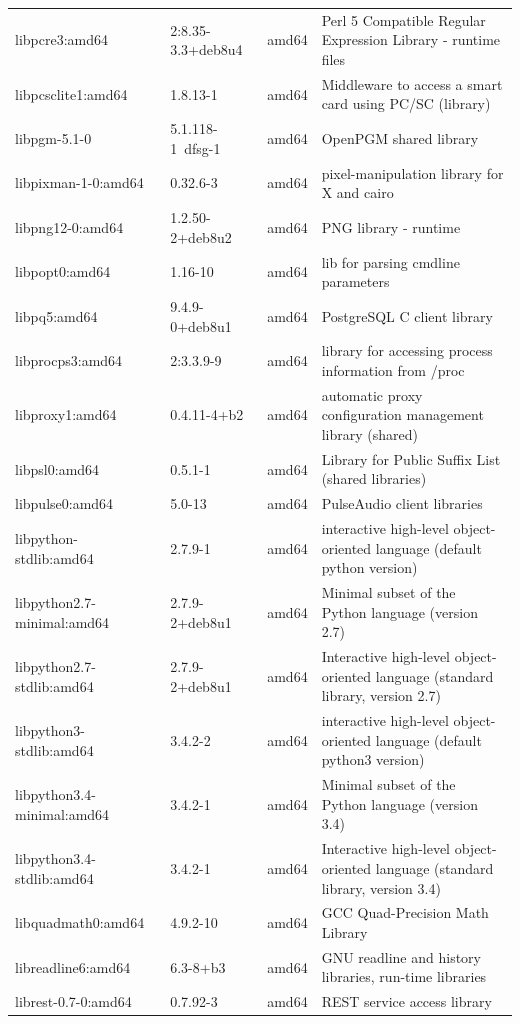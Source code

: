 \documentclass[a4paper,10pt]{article}
\begin{document}
\begin{appendices}
{\begin{longtable}{p{3.25cm}@{\hspace{0.25cm}}p{4cm}@{\hspace{0.25cm}}l@{\hspace{0.25cm}}p{7cm}}
libpcre3:amd64	&	2:8.35-3.3+deb8u4	&	amd64	&	Perl 5 Compatible Regular Expression Library - runtime files	\\
libpcsclite1:amd64	&	1.8.13-1	&	amd64	&	Middleware to access a smart card using PC/SC (library)	\\
libpgm-5.1-0	&	5.1.118-1~dfsg-1	&	amd64	&	OpenPGM shared library	\\
libpixman-1-0:amd64	&	0.32.6-3	&	amd64	&	pixel-manipulation library for X and cairo	\\
libpng12-0:amd64	&	1.2.50-2+deb8u2	&	amd64	&	PNG library - runtime	\\
libpopt0:amd64	&	1.16-10	&	amd64	&	lib for parsing cmdline parameters	\\
libpq5:amd64	&	9.4.9-0+deb8u1	&	amd64	&	PostgreSQL C client library	\\
libprocps3:amd64	&	2:3.3.9-9	&	amd64	&	library for accessing process information from /proc	\\
libproxy1:amd64	&	0.4.11-4+b2	&	amd64	&	automatic proxy configuration management library (shared)	\\
libpsl0:amd64	&	0.5.1-1	&	amd64	&	Library for Public Suffix List (shared libraries)	\\
libpulse0:amd64	&	5.0-13	&	amd64	&	PulseAudio client libraries	\\
libpython-stdlib:amd64	&	2.7.9-1	&	amd64	&	interactive high-level object-oriented language (default python version)	\\
libpython2.7-minimal:amd64	&	2.7.9-2+deb8u1	&	amd64	&	Minimal subset of the Python language (version 2.7)	\\
libpython2.7-stdlib:amd64	&	2.7.9-2+deb8u1	&	amd64	&	Interactive high-level object-oriented language (standard library, version 2.7)	\\
libpython3-stdlib:amd64	&	3.4.2-2	&	amd64	&	interactive high-level object-oriented language (default python3 version)	\\
libpython3.4-minimal:amd64	&	3.4.2-1	&	amd64	&	Minimal subset of the Python language (version 3.4)	\\
libpython3.4-stdlib:amd64	&	3.4.2-1	&	amd64	&	Interactive high-level object-oriented language (standard library, version 3.4)	\\
libquadmath0:amd64	&	4.9.2-10	&	amd64	&	GCC Quad-Precision Math Library	\\
libreadline6:amd64	&	6.3-8+b3	&	amd64	&	GNU readline and history libraries, run-time libraries	\\
librest-0.7-0:amd64	&	0.7.92-3	&	amd64	&	REST service access library	\\

\end{longtable}}
\end{appendices}
\end{document}
